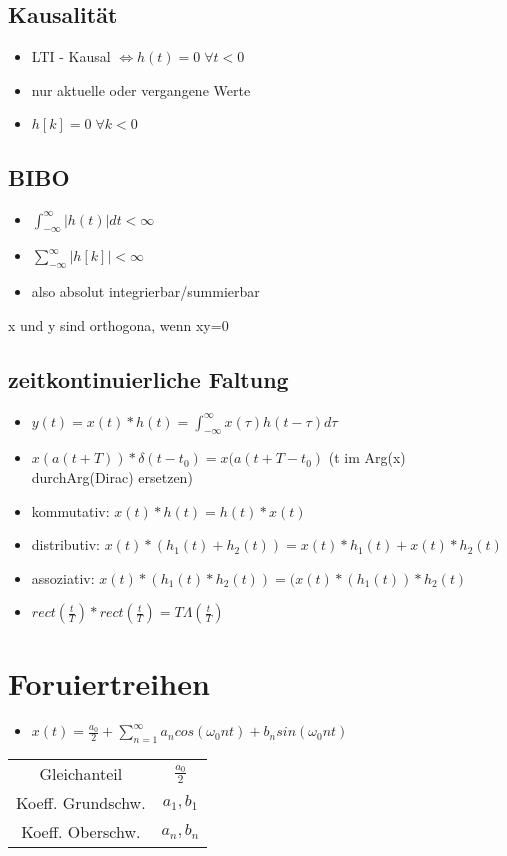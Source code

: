 \documentclass{article}
\begin{document}
\subsection{Kausalität}
\begin{itemize}
\item LTI - Kausal $\Leftrightarrow h(t) = 0 \;  \forall t < 0$
\item nur aktuelle oder vergangene Werte
\item $h[k] = 0 \; \forall k<0$
\end{itemize}

\subsection{BIBO}
\begin{itemize}
\item $\int_{-\infty}^\infty |h(t)|dt < \infty$
\item $\sum_{-\infty}^\infty |h[k]| < \infty$
\item also absolut integrierbar/summierbar
\end{itemize}

x und y sind orthogona, wenn xy=0 \newline

\subsection{zeitkontinuierliche Faltung}
\begin{itemize}
\item $y(t) = x(t)*h(t) = \int_{-\infty}^\infty x(\tau)h(t-\tau) d\tau$
\item $x(a(t+T))*\delta(t-t_0) = x(a(t+T-t_0)$ (t im Arg(x) durchArg(Dirac) ersetzen)
\item kommutativ: $x(t)*h(t) = h(t)*x(t)$
\item distributiv: $x(t)*(h_1(t)+h_2(t)) =x(t)*h_1(t)+x(t)*h_2(t)$
\item assoziativ: $x(t)*(h_1(t)*h_2(t)) = (x(t)*(h_1(t))*h_2(t)$
\item $rect(\frac{t}{T})*rect(\frac{t}{T}) =T \Lambda(\frac{t}{T})$
\end{itemize}



\section{Foruiertreihen}
\begin{itemize}
\item $x(t) = \frac{a_0}{2} + \sum_{n=1}^\infty a_n cos(\omega_0nt)+b_nsin(\omega_0nt)$
\end{itemize}
\begin{tabular}{ c c}
 Gleichanteil & $\frac{a_0}{2}$\\
 Koeff. Grundschw. & $a_1,b_1$ \\
 Koeff. Oberschw. & $a_n, b_n$ \\
 \end{tabular}
\end{document}
